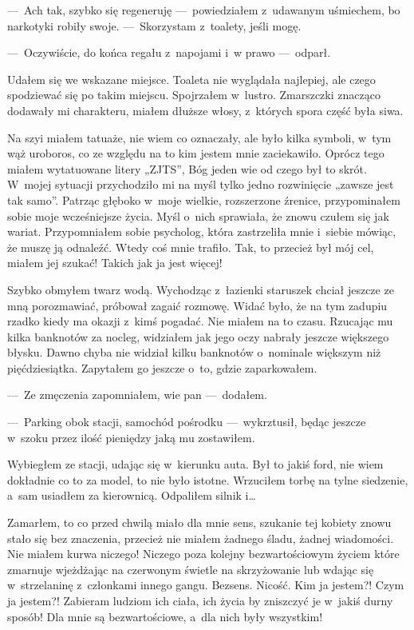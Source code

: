 ---~Ach tak, szybko się regeneruję ---~powiedziałem z~udawanym uśmiechem, bo narkotyki robiły swoje. ---~Skorzystam z~toalety, jeśli mogę.

---~Oczywiście, do końca regału z~napojami i~w prawo ---~odparł.
 
Udałem się we wskazane miejsce. Toaleta nie wyglądała najlepiej, ale czego spodziewać się po takim miejscu. Spojrzałem w~lustro. Zmarszczki znacząco dodawały mi charakteru, miałem dłuższe włosy, z~których spora część była siwa. 

Na szyi miałem tatuaże, nie wiem co oznaczały, ale było kilka symboli, w~tym wąż uroboros, co ze względu na to kim jestem mnie zaciekawiło. Oprócz tego miałem wytatuowane litery „ZJTS”, Bóg jeden wie od czego był to skrót. W~mojej sytuacji przychodziło mi na myśl tylko jedno rozwinięcie „zawsze jest tak samo”. Patrząc głęboko w~moje wielkie, rozszerzone źrenice, przypominałem sobie moje wcześniejsze życia. Myśl o~nich sprawiała, że znowu czułem się jak wariat. Przypomniałem sobie psycholog, która zastrzeliła mnie i~siebie mówiąc, że muszę ją odnaleźć. Wtedy coś mnie trafiło. Tak, to przecież był mój cel, miałem jej szukać! Takich jak ja jest więcej! 

Szybko obmyłem twarz wodą. Wychodząc z~łazienki staruszek chciał jeszcze ze mną porozmawiać, próbował zagaić rozmowę. Widać było, że na tym zadupiu rzadko kiedy ma okazji z~kimś pogadać. Nie miałem na to czasu. Rzucając mu kilka banknotów za nocleg, widziałem jak jego oczy nabrały jeszcze większego błysku. Dawno chyba nie widział kilku banknotów o~nominale większym niż pięćdziesiątka. Zapytałem go jeszcze o~to, gdzie zaparkowałem.

---~Ze zmęczenia zapomniałem, wie pan ---~dodałem.

---~Parking obok stacji, samochód pośrodku ---~wykrztusił, będąc jeszcze w~szoku przez ilość pieniędzy jaką mu zostawiłem.
 
Wybiegłem ze stacji, udając się w~kierunku auta. Był to jakiś ford, nie wiem dokładnie co to za model, to nie było istotne. Wrzuciłem torbę na tylne siedzenie, a~sam usiadłem za kierownicą. Odpaliłem silnik i… 

Zamarłem, to co przed chwilą miało dla mnie sens, szukanie tej kobiety znowu stało się bez znaczenia, przecież nie miałem żadnego śladu, żadnej wiadomości. Nie miałem kurwa niczego! Niczego poza kolejny bezwartościowym życiem które zmarnuje wjeżdżając na czerwonym świetle na skrzyżowanie lub wdając się w~strzelaninę z~członkami innego gangu. Bezsens. Nicość. Kim ja jestem?! Czym ja jestem?! Zabieram ludziom ich ciała, ich życia by zniszczyć je w~jakiś durny sposób! Dla mnie są bezwartościowe, a~dla nich były wszystkim!

